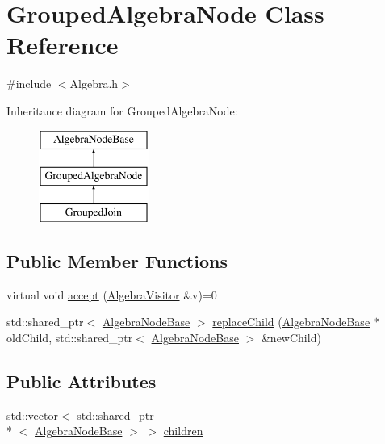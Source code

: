 \hypertarget{class_grouped_algebra_node}{\section{Grouped\+Algebra\+Node Class Reference}
\label{class_grouped_algebra_node}
}


{\ttfamily \#include $<$Algebra.\+h$>$}

Inheritance diagram for Grouped\+Algebra\+Node\+:\begin{figure}[H]
\begin{center}
\leavevmode
\includegraphics[height=3.000000cm]{class_grouped_algebra_node}
\end{center}
\end{figure}
\subsection*{Public Member Functions}
\begin{DoxyCompactItemize}
\item 
virtual void \hyperlink{class_grouped_algebra_node_a60aae470b5aee869eca9a504fdf79f32}{accept} (\hyperlink{class_algebra_visitor}{Algebra\+Visitor} \&v)=0
\item 
std\+::shared\+\_\+ptr$<$ \hyperlink{class_algebra_node_base}{Algebra\+Node\+Base} $>$ \hyperlink{class_grouped_algebra_node_a463e6303f6332fc9ed2a885e3456b58e}{replace\+Child} (\hyperlink{class_algebra_node_base}{Algebra\+Node\+Base} $\ast$old\+Child, std\+::shared\+\_\+ptr$<$ \hyperlink{class_algebra_node_base}{Algebra\+Node\+Base} $>$ \&new\+Child)
\end{DoxyCompactItemize}
\subsection*{Public Attributes}
\begin{DoxyCompactItemize}
\item 
std\+::vector$<$ std\+::shared\+\_\+ptr\\*
$<$ \hyperlink{class_algebra_node_base}{Algebra\+Node\+Base} $>$ $>$ \hyperlink{class_grouped_algebra_node_acabb532765e4d32cec630651bb5d726f}{children}
\end{DoxyCompactItemize}


